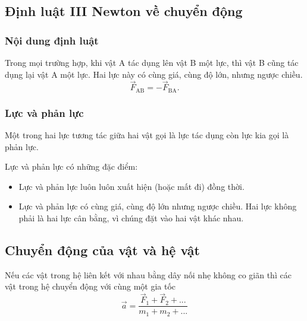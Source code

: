  
\subsection{Định luật III Newton về chuyển động}
\subsubsection{Nội dung định luật}
Trong mọi trường hợp, khi vật A tác dụng lên vật B một lực, thì vật B cũng tác dụng lại vật A một lực. Hai lực này có cùng giá, cùng độ lớn, nhưng ngược chiều.
\begin{equation*}
	{\vec F}_{\text{AB}}=-{\vec F}_{\text{BA}}.
\end{equation*}
\subsubsection{Lực và phản lực}
Một trong hai lực tương tác giữa hai vật gọi là lực tác dụng còn lực kia gọi là phản lực.

Lực và phản lực có những đặc điểm: 
\begin{itemize}
	\item Lực và phản lực luôn luôn xuất hiện (hoặc mất đi) đồng thời.
	\item Lực và phản lực có cùng giá, cùng độ lớn nhưng ngược chiều. Hai lực không phải là hai lực cân bằng, vì chúng đặt vào hai vật khác nhau.
\end{itemize}
\subsection{Chuyển động của vật và hệ vật}
Nếu các vật trong hệ liên kết với nhau bằng dây nối nhẹ không co giãn thì các vật trong hệ chuyển động với cùng một gia tốc
\begin{equation*}
	\vec a = \dfrac{\vec F_1 + \vec F_2 + ...}{m_1 + m_2+...}
\end{equation*}
\vspace{0.3cm}

